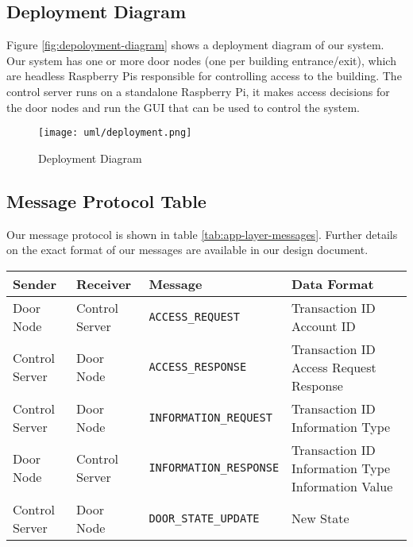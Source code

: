 
\subsection{Deployment Diagram}

Figure \ref{fig:depoloyment-diagram} shows a deployment diagram of our system.
Our system has one or more door nodes (one per building entrance/exit), which
are headless Raspberry Pis responsible for controlling access to the building.
The control server runs on a standalone Raspberry Pi, it makes access decisions
for the door nodes and run the GUI that can be used to control the system.

\begin{figure}[!htb]
\centering
\texttt{[image: uml/deployment.png]}
\caption{Deployment Diagram}
\label{fig:deployment-diagram}
\end{figure}

\subsection{Message Protocol Table}

Our message protocol is shown in table \ref{tab:app-layer-messages}. Further
details on the exact format of our messages are available in our design
document.

\begin{table*}[htb]
\begin{tabular}{ l | l | l | p{4.5cm} }
\toprule
Sender & Receiver & Message & Data Format\\
\midrule
Door Node & Control Server & \verb|ACCESS_REQUEST| &
Transaction ID \newline Account ID\\
\hline
Control Server & Door Node & \verb|ACCESS_RESPONSE| &
Transaction ID \newline Access Request Response\\
\hline
Control Server & Door Node & \verb|INFORMATION_REQUEST| &
Transaction ID \newline Information Type\\
\hline
Door Node & Control Server & \verb|INFORMATION_RESPONSE| &
Transaction ID \newline Information Type \newline Information Value\\
\hline
Control Server & Door Node & \verb|DOOR_STATE_UPDATE| & New State\\
\bottomrule
\end{tabular}
\caption{Application Layer Messages}
\label{tab:app-layer-messages}
\end{table*}

